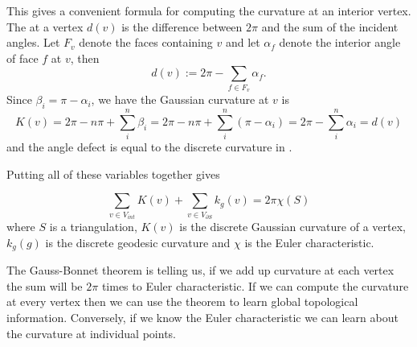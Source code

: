 This gives a convenient formula for computing the curvature at an interior vertex.
The  at a vertex $d(v)$ is the difference between $2\pi$ and
the sum of the incident angles.  Let $F_v$ denote the faces containing $v$  
and let $\alpha_f$  denote the interior  angle of face $f$ at $v$, then
\begin{equation} \label{eqn:defect}
d(v):=2\pi -\sum_{f\in F_v}\alpha_f.
\end{equation}
Since $\beta_i=\pi-\alpha_i$, we have the Gaussian curvature at $v$
is 
$$K(v)=2\pi -n\pi+\sum_{i}^n \beta_i=2\pi-n\pi +\sum_{i}^n (\pi-\alpha_i) =2\pi-\sum_i^n\alpha_i=d(v)$$
 and the
 angle defect is equal to the discrete curvature in .







Putting all of these variables together gives

\begin{theorem} \label{thm:g-b-d}

$$\sum_{v\in V_{int}} K(v) + \sum_{v\in V_{\partial S}} k_g(v) = 2\pi \chi(S)$$
where $S$ is a triangulation, $K(v)$ is the discrete Gaussian curvature
of a vertex, $k_g(g)$ is the discrete geodesic curvature and
$\chi$ is the Euler characteristic.
\end{theorem}

The  Gauss-Bonnet theorem is  telling us, if we add up curvature
at each vertex the sum will be $2\pi$ times to Euler characteristic.
If we can compute the curvature at every vertex then we can use the theorem
to learn global topological information.
Conversely, if we know the Euler characteristic we can learn about the curvature
at individual points.

